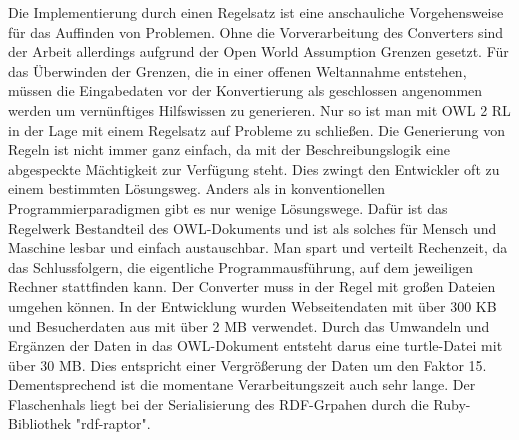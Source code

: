 \documentclass[runningheads,a4paper]{llncs}
\begin{document}


Die Implementierung durch einen Regelsatz ist eine anschauliche Vorgehensweise für das Auffinden von Problemen. 
Ohne die Vorverarbeitung des Converters sind der Arbeit allerdings aufgrund der Open World Assumption Grenzen gesetzt.
Für das Überwinden der Grenzen, die in einer offenen Weltannahme entstehen, müssen die Eingabedaten vor der Konvertierung als geschlossen angenommen werden um vernünftiges Hilfswissen zu generieren.
Nur so ist man mit OWL 2 RL in der Lage mit einem Regelsatz auf Probleme zu schließen.
Die Generierung von Regeln ist nicht immer ganz einfach, da mit der Beschreibungslogik eine abgespeckte Mächtigkeit zur Verfügung steht. 
Dies zwingt den Entwickler oft zu einem bestimmten Lösungsweg.
Anders als in konventionellen Programmierparadigmen gibt es nur wenige Lösungswege.
Dafür ist das Regelwerk Bestandteil des OWL-Dokuments und ist als solches für Mensch und Maschine lesbar und einfach austauschbar.
Man spart und verteilt Rechenzeit, da das Schlussfolgern, die eigentliche Programmausführung, auf dem jeweiligen Rechner stattfinden kann.
Der Converter muss in der Regel mit großen Dateien umgehen können.
In der Entwicklung wurden Webseitendaten mit über 300 KB und Besucherdaten aus mit über 2 MB verwendet.
Durch das Umwandeln und Ergänzen der Daten in das OWL-Dokument entsteht darus eine turtle-Datei mit über 30 MB.
Dies entspricht einer Vergrößerung der Daten um den Faktor 15.
Dementsprechend ist die momentane Verarbeitungszeit auch sehr lange.
Der Flaschenhals liegt bei der Serialisierung des RDF-Grpahen durch die Ruby-Bibliothek {}"rdf-raptor{}".



\nocite{url_dl_primer}



\end{document}
